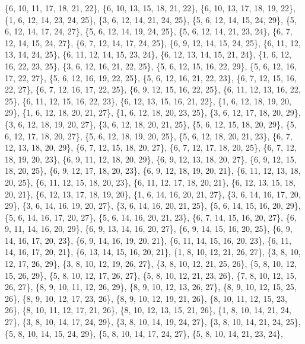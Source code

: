 \documentclass[11pt,a4paper]{article}
\begin{document}
{\{6, 10, 11, 17, 18, 21, 22\}, \{6, 10, 13, 15, 18, 21, 22\}, \{6, 10, 13, 17, 18, 19, 22\}, \{1, 6, 12, 14, 23, 24, 25\}, \{3, 6, 12, 14, 21, 24, 25\},
\{5, 6, 12, 14, 15, 24, 29\}, \{5, 6, 12, 14, 17, 24, 27\}, \{5, 6, 12, 14, 19, 24, 25\}, \{5, 6, 12, 14, 21, 23, 24\}, \{6, 7, 12, 14, 15, 24, 27\},
\{6, 7, 12, 14, 17, 24, 25\}, \{6, 9, 12, 14, 15, 24, 25\}, \{6, 11, 12, 13, 14, 24, 25\}, \{6, 11, 12, 14, 15, 23, 24\}, \{6, 12, 13, 14, 15, 21, 24\},
\{1, 6, 12, 16, 22, 23, 25\}, \{3, 6, 12, 16, 21, 22, 25\}, \{5, 6, 12, 15, 16, 22, 29\}, \{5, 6, 12, 16, 17, 22, 27\}, \{5, 6, 12, 16, 19, 22, 25\},
\{5, 6, 12, 16, 21, 22, 23\}, \{6, 7, 12, 15, 16, 22, 27\}, \{6, 7, 12, 16, 17, 22, 25\}, \{6, 9, 12, 15, 16, 22, 25\}, \{6, 11, 12, 13, 16, 22, 25\},
\{6, 11, 12, 15, 16, 22, 23\}, \{6, 12, 13, 15, 16, 21, 22\}, \{1, 6, 12, 18, 19, 20, 29\}, \{1, 6, 12, 18, 20, 21, 27\}, \{1, 6, 12, 18, 20, 23, 25\},
\{3, 6, 12, 17, 18, 20, 29\}, \{3, 6, 12, 18, 19, 20, 27\}, \{3, 6, 12, 18, 20, 21, 25\}, \{5, 6, 12, 15, 18, 20, 29\}, \{5, 6, 12, 17, 18, 20, 27\},
\{5, 6, 12, 18, 19, 20, 25\}, \{5, 6, 12, 18, 20, 21, 23\}, \{6, 7, 12, 13, 18, 20, 29\}, \{6, 7, 12, 15, 18, 20, 27\}, \{6, 7, 12, 17, 18, 20, 25\},
\{6, 7, 12, 18, 19, 20, 23\}, \{6, 9, 11, 12, 18, 20, 29\}, \{6, 9, 12, 13, 18, 20, 27\}, \{6, 9, 12, 15, 18, 20, 25\}, \{6, 9, 12, 17, 18, 20, 23\},
\{6, 9, 12, 18, 19, 20, 21\}, \{6, 11, 12, 13, 18, 20, 25\}, \{6, 11, 12, 15, 18, 20, 23\}, \{6, 11, 12, 17, 18, 20, 21\}, \{6, 12, 13, 15, 18, 20, 21\},
\{6, 12, 13, 17, 18, 19, 20\}, \{1, 6, 14, 16, 20, 21, 27\}, \{3, 6, 14, 16, 17, 20, 29\}, \{3, 6, 14, 16, 19, 20, 27\}, \{3, 6, 14, 16, 20, 21, 25\},
\{5, 6, 14, 15, 16, 20, 29\}, \{5, 6, 14, 16, 17, 20, 27\}, \{5, 6, 14, 16, 20, 21, 23\}, \{6, 7, 14, 15, 16, 20, 27\}, \{6, 9, 11, 14, 16, 20, 29\},
\{6, 9, 13, 14, 16, 20, 27\}, \{6, 9, 14, 15, 16, 20, 25\}, \{6, 9, 14, 16, 17, 20, 23\}, \{6, 9, 14, 16, 19, 20, 21\}, \{6, 11, 14, 15, 16, 20, 23\},
\{6, 11, 14, 16, 17, 20, 21\}, \{6, 13, 14, 15, 16, 20, 21\}, \{1, 8, 10, 12, 21, 26, 27\}, \{3, 8, 10, 12, 17, 26, 29\}, \{3, 8, 10, 12, 19, 26, 27\},
\{3, 8, 10, 12, 21, 25, 26\}, \{5, 8, 10, 12, 15, 26, 29\}, \{5, 8, 10, 12, 17, 26, 27\}, \{5, 8, 10, 12, 21, 23, 26\}, \{7, 8, 10, 12, 15, 26, 27\},
\{8, 9, 10, 11, 12, 26, 29\}, \{8, 9, 10, 12, 13, 26, 27\}, \{8, 9, 10, 12, 15, 25, 26\}, \{8, 9, 10, 12, 17, 23, 26\}, \{8, 9, 10, 12, 19, 21, 26\},
\{8, 10, 11, 12, 15, 23, 26\}, \{8, 10, 11, 12, 17, 21, 26\}, \{8, 10, 12, 13, 15, 21, 26\}, \{1, 8, 10, 14, 21, 24, 27\}, \{3, 8, 10, 14, 17, 24, 29\},
\{3, 8, 10, 14, 19, 24, 27\}, \{3, 8, 10, 14, 21, 24, 25\}, \{5, 8, 10, 14, 15, 24, 29\}, \{5, 8, 10, 14, 17, 24, 27\}, \{5, 8, 10, 14, 21, 23, 24\},
}
\end{document}

